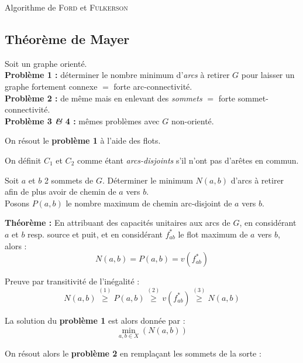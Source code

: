 \documentclass[a4paper, 8pt]{article}
\begin{document}
\begin{multicols*}{3}
\begin{algorithm}[H]
 \caption{Algorithme de \textsc{Ford} et \textsc{Fulkerson}}
\end{algorithm}

\subsection*{Théorème de Mayer}
Soit \GXA un graphe orienté.\\
\textbf{Problème 1 :} déterminer le nombre minimum d'\textit{arcs} à retirer $G$ pour laisser un graphe fortement connexe $=$ forte arc-connectivité.\\
\textbf{Problème 2 :} de même mais en enlevant des \textit{sommets} $=$ forte sommet-connectivité.\\
\textbf{Problème 3 \textit{\&} 4 :} mêmes problèmes avec $G$ non-orienté.

On résout le \textbf{problème 1} à l'aide des flots.

On définit $C_1$ et $C_2$ comme étant \emph{arcs-disjoints} s'il n'ont pas d'arêtes en commun.

\underline{} Soit $a$ et $b$ 2 sommets de $G$. Déterminer le minimum $N(a,b)$ d'arcs à retirer afin de plus avoir de chemin de $a$ vers $b$.\\
Posons $P(a,b)$ le nombre maximum de chemin arc-disjoint de $a$ vers $b$.

\smallskip
\textbf{Théorème :} En attribuant des capacités unitaires aux arcs de $G$, en considérant $a$ et $b$ resp. source et puit, et en considérant $f^*_{ab}$ le flot maximum de $a$ vers $b$, alors :
\[ N(a,b) = P(a,b) = v(f^*_{ab}) \]

Preuve par transitivité de l'inégalité :
\[ N(a,b) \overset{(1)}{\geqslant} P(a,b) \overset{(2)}{\geqslant} v(f^*_{ab}) \overset{(3)}{\geqslant} N(a,b)\]

La solution du \textbf{problème 1} est alors donnée par :
\[ \displaystyle \min_{a,b\in X}\left(N(a,b)\right) \]

On résout alors le \textbf{problème 2} en remplaçant les sommets de la sorte :
\begin{center}
\end{center}
\end{multicols*}
\end{document}

